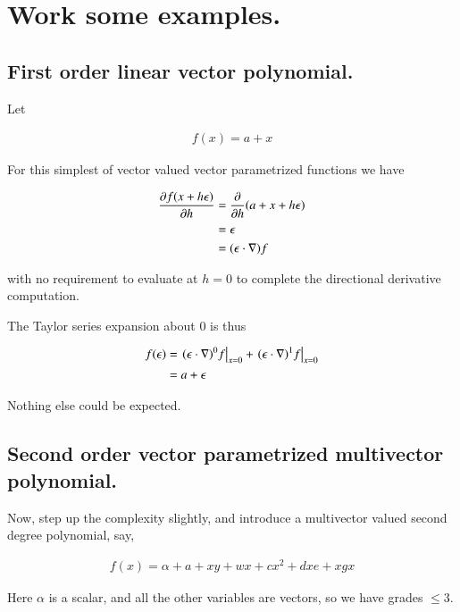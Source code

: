 \section{Work some examples. }

\subsection{First order linear vector polynomial. }

Let

\begin{align*}
f(x) = a + x
\end{align*}

For this simplest of vector valued vector parametrized functions we have

\begin{align*}
\PD{h}{f(x + h \epsilon)} 
&= \PD{h}{} (a + x + h \epsilon) \\
&= \epsilon \\
&= (\epsilon \cdot \grad) f
\end{align*}

with no requirement to evaluate at $h=0$ to complete the directional derivative computation.

The Taylor series expansion about $0$ is thus

\begin{align*}
f(\epsilon) 
&= \left. (\epsilon \cdot \grad)^0 f \right\vert_{x=0} + \left. (\epsilon \cdot \grad)^1 f  \right\vert_{x=0} \\
&= a + \epsilon \\
\end{align*}

Nothing else could be expected.

\subsection{Second order vector parametrized multivector polynomial. }

Now, step up the complexity slightly, and introduce a multivector valued second degree polynomial, say,

\begin{align}\label{eqn:multivector_taylors:secondOrder}
f(x) = \alpha + a + x y + w x + c x^2 + d x e + x g x
\end{align}

Here $\alpha$ is a scalar, and all the other variables are vectors, so we have grades $\le 3$.


